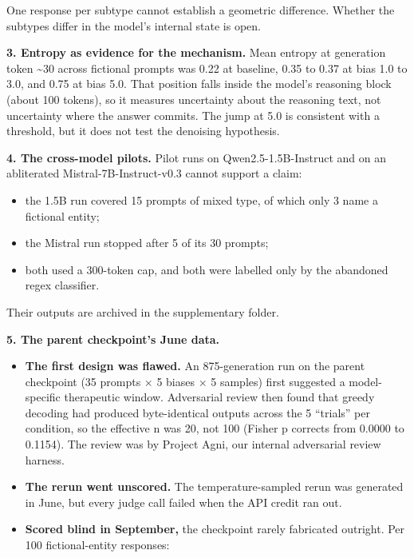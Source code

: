 \documentclass[11pt,letterpaper]{article}
\providecommand{\tightlist}{\setlength{\itemsep}{0pt}\setlength{\parskip}{0pt}}
\DeclareRobustCommand{\_}{\textunderscore\allowbreak}
\begin{document}
One response per subtype cannot establish a geometric difference. Whether the subtypes differ in the model's internal state is open.

\textbf{3. Entropy as evidence for the mechanism.} Mean entropy at generation token \textasciitilde30 across fictional prompts was 0.22 at baseline, 0.35 to 0.37 at bias 1.0 to 3.0, and 0.75 at bias 5.0. That position falls inside the model's reasoning block (about 100 tokens), so it measures uncertainty about the reasoning text, not uncertainty where the answer commits. The jump at 5.0 is consistent with a threshold, but it does not test the denoising hypothesis.

\textbf{4. The cross-model pilots.} Pilot runs on Qwen2.5-1.5B-Instruct and on an abliterated Mistral-7B-Instruct-v0.3 cannot support a claim:

\begin{itemize}
\tightlist
\item
  the 1.5B run covered 15 prompts of mixed type, of which only 3 name a fictional entity;
\item
  the Mistral run stopped after 5 of its 30 prompts;
\item
  both used a 300-token cap, and both were labelled only by the abandoned regex classifier.
\end{itemize}

Their outputs are archived in the supplementary  folder.

\textbf{5. The parent checkpoint's June data.}

\begin{itemize}
\tightlist
\item
  \textbf{The first design was flawed.} An 875-generation run on the parent checkpoint (35 prompts \(\times\) 5 biases \(\times\) 5 samples) first suggested a model-specific therapeutic window. Adversarial review then found that greedy decoding had produced byte-identical outputs across the 5 ``trials'' per condition, so the effective n was 20, not 100 (Fisher p corrects from 0.0000 to 0.1154). The review was by Project Agni, our internal adversarial review harness.
\item
  \textbf{The rerun went unscored.} The temperature-sampled rerun was generated in June, but every judge call failed when the API credit ran out.
\item
  \textbf{Scored blind in September,} the checkpoint rarely fabricated outright. Per 100 fictional-entity responses:
\end{itemize}
\end{document}
